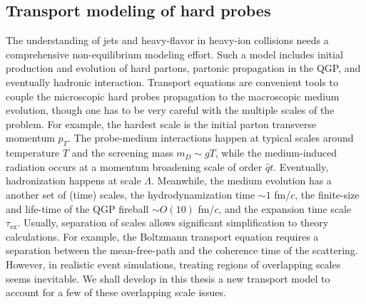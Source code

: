 \subsection{Transport modeling of hard probes}
The understanding of jets and heavy-flavor in heavy-ion collisions needs a comprehensive non-equilibrium modeling effort.
Such a model includes initial production and evolution of hard partons, partonic propagation in the QGP, and eventually hadronic interaction.
Transport equations are convenient tools to couple the microscopic hard probes propagation to the macroscopic medium evolution, though one has to be very careful with the multiple scales of the problem.
For example, the hardest scale is the initial parton transverse momentum $p_T$.
The probe-medium interactions happen at typical scales around temperature $T$ and the screening mass $m_D \sim gT$, while the medium-induced radiation occurs at a momentum broadening scale of order $\hat{q} t$.
Eventually, hadronization happens at scale $\Lambda$.
Meanwhile, the medium evolution has a another set of (time) scales, the hydrodynamization time $\sim 1$ fm/$c$, the finite-size and life-time of the QGP fireball $\sim O(10)$  fm/$c$, and the expansion time scale $\tau_{\textrm{ex}}$.
Usually, separation of scales allows significant simplification to theory calculations.
For example, the Boltzmann transport equation requires a separation between the mean-free-path and the coherence time of the scattering.
However, in realistic event simulations, treating regions of overlapping scales seems inevitable.
We shall develop in this thesis a new transport model to account for a few of these overlapping scale issues.

